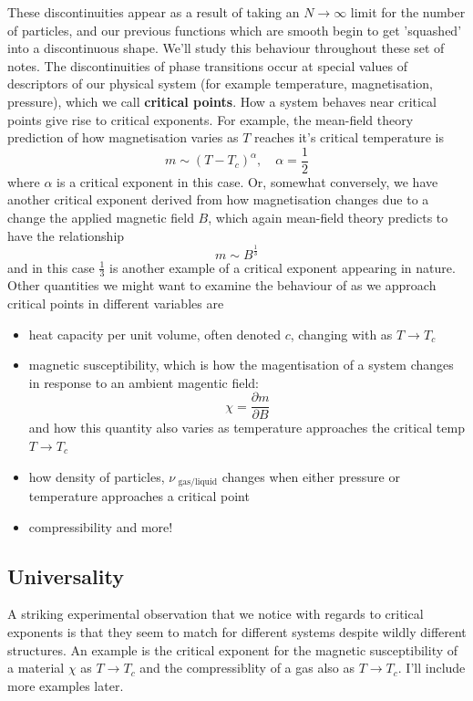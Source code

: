 \documentclass[11pt, oneside]{article}   	%
\begin{document}
These discontinuities appear as a result of taking an $N \rightarrow \infty$ limit for the number of particles, and our previous functions which are smooth begin to get 'squashed' into a discontinuous shape. We'll study this behaviour throughout these set of notes. The discontinuities of phase transitions occur at special values of descriptors of our physical system (for example temperature, magnetisation, pressure), which we call \textbf{critical points}. How a system behaves near critical points give rise to critical exponents. For example, the mean-field theory prediction of how magnetisation varies as $T$ reaches it's critical temperature is \[ 
m \sim (T - T_c)^\alpha,\quad \alpha = \frac{ 1}{2} \] 
where $\alpha$ is a critical exponent in this case. Or, somewhat conversely, we have another critical exponent derived from how magnetisation changes due to a change the applied magnetic field $B$, which again mean-field theory predicts to have the relationship \[ m \sim B^{ \frac{ 1}{3}} \] and in this case $\frac{ 1}{ 3}$ is another example of a critical exponent appearing in nature. 
Other quantities we might want to examine the behaviour of as we approach critical points in different variables are 
\begin{itemize} 
	\item heat capacity per unit volume, often denoted $c$, changing with as $T \rightarrow T_c $
	\item magnetic susceptibility, which is how the magentisation of a system changes in response to an ambient magentic field: \[ \chi = \frac{ \partial m}{ \partial B } \] and how this quantity also varies as temperature approaches the critical temp $T \rightarrow T_c$
	\item how density of particles, $\nu_{ \text{ gas} / \text{liquid}}$ changes when either pressure or temperature approaches a critical point 
	\item compressibility and more! 
\end{itemize}  
 
\subsection{Universality} 
A striking experimental observation that we notice with regards to critical exponents is that they seem to match for different systems despite wildly different structures. An example is the critical exponent for the magnetic susceptibility of a material $\chi$ as $T \rightarrow T_c$ and the compressiblity of a gas also as $T \rightarrow T_c$. I'll include more examples later. 
\end{document}
